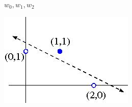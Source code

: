 \documentclass[11pt]{article}
\begin{document}
\(w_0, w_1, w_2\)

\includegraphics{img}
\end{document}
